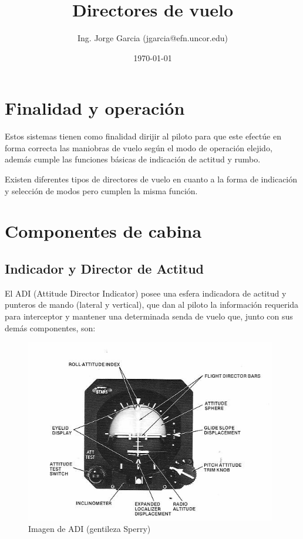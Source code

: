 \documentclass[a4paper,12pt,twoside]{article}
\title{Directores de vuelo}
\author{Ing. Jorge Garcia (jgarcia@efn.uncor.edu)}
\date{\today}
\begin{document}
\renewcommand{\tablename}{Tabla}

\newcommand{\ESPACIO}{\rule{0in}{3ex}}

\thispagestyle{fancy}
\maketitle

\thispagestyle{fancy}
\tableofcontents


\section{Finalidad y operaci\'on}
\label{sec:finalidad.y.operacion}


Estos sistemas tienen como finalidad dirijir al piloto para que este efect\'ue en forma correcta las maniobras de vuelo seg\'un el modo de operaci\'on elejido, adem\'as cumple las funciones b\'asicas de indicaci\'on de actitud y rumbo.

Existen diferentes tipos de directores de vuelo en cuanto a la forma de 
indicaci\'on y selecci\'on de modos pero cumplen la misma funci\'on.

\section{Componentes de cabina}
\label{sec:componentes.cabina}

\subsection{Indicador y Director de Actitud }
\label{sec:adi}

El ADI (Attitude Director Indicator)
 posee una esfera indicadora de actitud y punteros de 
mando (lateral y vertical), que dan al piloto la informaci\'on requerida
para interceptor y mantener una determinada senda de vuelo que, junto
con sus dem\'as componentes, son:

\begin{figure}[!h]\centering
  \includegraphics[width=0.98\textwidth]{imagenes/adi.png}
  \caption{Imagen de ADI (gentileza Sperry)}
\label{fig:adi.sperry}
\end{figure}
\end{document}
